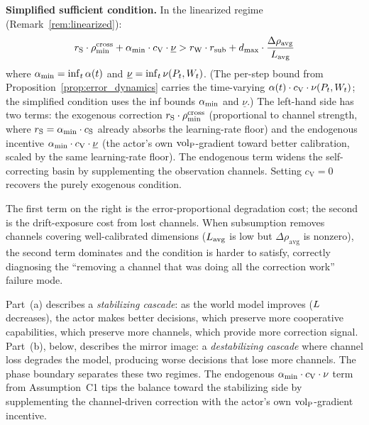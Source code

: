 \begin{theorem}
\medskip
\noindent\textbf{Simplified sufficient condition.}  In the linearized
regime (Remark~\ref{rem:linearized}):
\begin{equation}
\label{eq:self_correcting}
r_{\mathrm{S}} \cdot \rho_{\min}^{\mathrm{cross}} + \alpha_{\min} \cdot c_{\mathrm{V}} \cdot \underline{\nu}
  > r_{\mathrm{W}} \cdot r_{\mathrm{sub}}
  + d_{\mathrm{max}} \cdot \frac{\Delta\rho_{\mathrm{avg}}}{L_{\mathrm{avg}}}
\end{equation}
where $\alpha_{\min} = \inf_t \alpha(t)$ and
$\underline{\nu} = \inf_t \nu(P_t, W_t)$.  (The per-step bound from
Proposition~\ref{prop:error_dynamics} carries the time-varying
$\alpha(t) \cdot c_{\mathrm{V}} \cdot \nu(P_t, W_t)$; the
simplified condition uses the inf bounds $\alpha_{\min}$ and
$\underline{\nu}$.)  The left-hand side has two
terms: the exogenous correction $r_{\mathrm{S}} \cdot \rho_{\min}^{\mathrm{cross}}$ (proportional
to channel strength, where $r_{\mathrm{S}} = \alpha_{\min} \cdot c_{\mathrm{S}}$
already absorbs the learning-rate floor) and the endogenous incentive
$\alpha_{\min} \cdot c_{\mathrm{V}}
\cdot \underline{\nu}$ (the actor's own ${\operatorname{vol}_{\mathrm{P}}}$-gradient toward better
calibration, scaled by the same learning-rate floor).  The endogenous term
widens the self-correcting basin by supplementing the observation
channels.  Setting $c_{\mathrm{V}} = 0$ recovers the purely exogenous
condition.

The first term on the right is the error-proportional degradation cost;
the second is the drift-exposure cost from lost channels.  When
subsumption removes channels covering well-calibrated dimensions
($L_{\mathrm{avg}}$ is low but $\Delta\rho_{\mathrm{avg}}$ is
nonzero), the second term dominates and the condition is harder to
satisfy, correctly diagnosing the ``removing a channel that was doing
all the correction work'' failure mode.

\begin{remark}
\label{rem:stabilizing_cascade}
Part~(a) describes a \emph{stabilizing cascade}: as the world model
improves ($L$ decreases), the actor makes better decisions, which
preserve more cooperative capabilities, which preserve more channels,
which provide more correction signal.  Part~(b), below, describes the
mirror image: a \emph{destabilizing cascade} where channel loss
degrades the model, producing worse decisions that lose more channels.
The phase boundary separates these two regimes.  The endogenous
$\alpha_{\min} \cdot c_{\mathrm{V}} \cdot \nu$ term from Assumption~C1 tips the balance
toward the stabilizing side by supplementing the channel-driven
correction with the actor's own ${\operatorname{vol}_{\mathrm{P}}}$-gradient incentive.


\end{remark}
\end{theorem}
